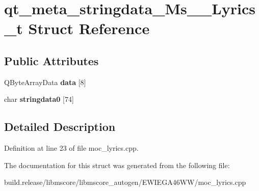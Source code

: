 \hypertarget{structqt__meta__stringdata___ms_____lyrics__t}{}\section{qt\+\_\+meta\+\_\+stringdata\+\_\+\+Ms\+\_\+\+\_\+\+Lyrics\+\_\+t Struct Reference}
\label{structqt__meta__stringdata___ms_____lyrics__t}
\subsection*{Public Attributes}
\begin{DoxyCompactItemize}
\item 
\mbox{\label{structqt__meta__stringdata___ms_____lyrics__t_a8a0cfe48e7104ddfcffeeda3cfa1b98f}} 
Q\+Byte\+Array\+Data {\bfseries data} \mbox{[}8\mbox{]}
\item 
\mbox{\label{structqt__meta__stringdata___ms_____lyrics__t_a385293dcb1fa924d5e7719da069a98df}} 
char {\bfseries stringdata0} \mbox{[}74\mbox{]}
\end{DoxyCompactItemize}


\subsection{Detailed Description}


Definition at line 23 of file moc\+\_\+lyrics.\+cpp.



The documentation for this struct was generated from the following file\+:\begin{DoxyCompactItemize}
\item 
build.\+release/libmscore/libmscore\+\_\+autogen/\+E\+W\+I\+E\+G\+A46\+W\+W/moc\+\_\+lyrics.\+cpp\end{DoxyCompactItemize}

